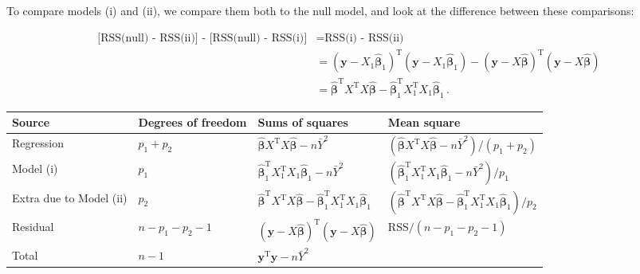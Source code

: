 \documentclass[
]{book}
\theoremstyle{definition}
\theoremstyle{definition}
\theoremstyle{definition}
\theoremstyle{definition}
\theoremstyle{remark}
\begin{document}
\begin{enumerate}
  To compare models (i) and (ii), we compare them both to the null model, and look at the difference between these comparisons:

  \begin{align*}
   \mbox{[RSS(null) - RSS(ii)] - [RSS(null) - RSS(i)]} & = \mbox{RSS(i) - RSS(ii)}\\
   & = (\boldsymbol{y}- X_1\hat{\boldsymbol{\beta}}_1)^{\mathrm{T}}(\boldsymbol{y}- X_1\hat{\boldsymbol{\beta}}_1) - (\boldsymbol{y}- X\hat{\boldsymbol{\beta}})^{\mathrm{T}}(\boldsymbol{y}- X\hat{\boldsymbol{\beta}})\\
   & = \hat{\boldsymbol{\beta}}^{\mathrm{T}}X^{\mathrm{T}}X\hat{\boldsymbol{\beta}} - \hat{\boldsymbol{\beta}}_1^{\mathrm{T}}X_1^{\mathrm{T}}X_1\hat{\boldsymbol{\beta}}_1\,.
   \end{align*}

  \begin{longtable}[]{@{}
    >{\raggedright\arraybackslash}p{}
    >{\centering\arraybackslash}p{}
    >{\centering\arraybackslash}p{}
    >{\centering\arraybackslash}p{}@{}}
  \toprule
  Source & Degrees of freedom & Sums of squares & Mean square \\
  \midrule
  \endhead
  Regression & \(p_1+p_2\) & \(\hat{\boldsymbol{\beta}}X^{\mathrm{T}}X\hat{\boldsymbol{\beta}} - n\bar{Y}^2\) & \(\left(\hat{\boldsymbol{\beta}}X^{\mathrm{T}}X\hat{\boldsymbol{\beta}} - n\bar{Y}^2\right)/(p_1+p_2)\) \\
  Model (i) & \(p_1\) & \(\hat{\boldsymbol{\beta}}_1^{\mathrm{T}}X_1^{\mathrm{T}}X_1\hat{\boldsymbol{\beta}}_1 - n\bar{Y}^2\) & \(\left(\hat{\boldsymbol{\beta}}_1^{\mathrm{T}}X_1^{\mathrm{T}}X_1\hat{\boldsymbol{\beta}}_1 - n\bar{Y}^2\right)/p_1\) \\
  Extra due to Model (ii) & \(p_2\) & \(\hat{\boldsymbol{\beta}}^{\mathrm{T}}X^{\mathrm{T}}X\hat{\boldsymbol{\beta}} - \hat{\boldsymbol{\beta}}_1^{\mathrm{T}}X_1^{\mathrm{T}}X_1\hat{\boldsymbol{\beta}}_1\) & \(\left(\hat{\boldsymbol{\beta}}^{\mathrm{T}}X^{\mathrm{T}}X\hat{\boldsymbol{\beta}} - \hat{\boldsymbol{\beta}}_1^{\mathrm{T}}X_1^{\mathrm{T}}X_1\hat{\boldsymbol{\beta}}_1\right)/p_2\) \\
  Residual & \(n-p_1-p_2-1\) & \((\boldsymbol{y}- X\hat{\boldsymbol{\beta}})^{\mathrm{T}}(\boldsymbol{y}- X\hat{\boldsymbol{\beta}})\) & RSS\(/(n-p_1-p_2-1)\) \\
  Total & \(n-1\) & \(\boldsymbol{y}^{\mathrm{T}}\boldsymbol{y}- n\bar{Y}^2\) & \\
  \bottomrule
  \end{longtable}
\end{enumerate}
\end{document}
